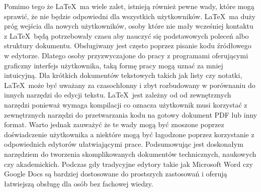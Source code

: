 Pomimo tego że \LaTeX\ ma wiele zalet, istnieją również pewne wady, które mogą sprawić, że nie będzie odpowiedni dla wszystkich użytkowników.
\LaTeX\ ma duży próg wejścia dla nowych użytkowników, osoby które nie mały wcześniej kontaktu z \LaTeX\ będą potrzebowały czasu aby nauczyć się podstawowych poleceń albo struktury dokumentu. Obsługiwany jest często poprzez pisanie kodu źródłowego w edytorze. Dlatego osoby przyzwyczajone do pracy z programami oferującymi graficzny interfejs użytkownika, taką formę pracy mogą uznać za mniej intuicyjną. Dla krótkich dokumentów tekstowych takich jak listy czy notatki, \LaTeX\ może być uważany za czasochłonny i zbyt rozbudowany w porównaniu do innych narzędzi do edycji tekstu.
\LaTeX\ jest zależny od  od zewnętrznych narzędzi ponieważ wymaga kompilacji co oznacza użytkownik musi korzystać z zewnętrznych narzędzi do przetwarzania kodu na gotowy dokument PDF lub inny format. Warto jednak zauważyć że te wady mogą być znoszone poprzez doświadczenie użytkownika a niektóre mogą być łagodzone poprzez korzystanie z odpowiednich edytorów ułatwiającymi prace.
Podsumowując jest doskonałym narzędziem do tworzenia skomplikowanych dokumentów technicznych, naukowych czy akademickich. Podczas gdy tradycyjne edytory takie jak Microsoft Word czy Google Docs są bardziej dostosowane do prostszych zastosowań i oferują łatwiejszą obsługę dla osób bez fachowej wiedzy.